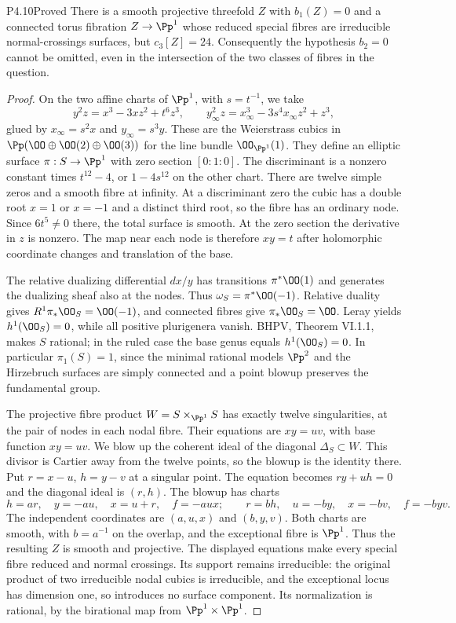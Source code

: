 \begin{statement}{P4.10}{Proved}
There is a smooth projective threefold $Z$ with $b_1(Z)=0$ and a
connected torus fibration $Z\to\Pp^1$ whose reduced special fibres
are irreducible normal-crossings surfaces, but $c_3[Z]=24$.
Consequently the hypothesis $b_2=0$ cannot be omitted, even in the
intersection of the two classes of fibres in the question.
\end{statement}
\begin{proof}
On the two affine charts of $\Pp^1$, with $s=t^{-1}$, we take
\[
 y^2z=x^3-3xz^2+t^6z^3,\qquad
 y_\infty^2z=x_\infty^3-3s^4x_\infty z^2+z^3,
\]
glued by $x_\infty=s^2x$ and $y_\infty=s^3y$. These are the
Weierstrass cubics in $\Pp(\OO\oplus\OO(2)\oplus\OO(3))$ for
the line bundle $\OO_{\Pp^1}(1)$. They define an elliptic surface
$\pi:S\to\Pp^1$ with zero section $[0:1:0]$. The discriminant
is a nonzero constant times $t^{12}-4$, or $1-4s^{12}$ on the
other chart. There are twelve simple zeros and a smooth fibre at
infinity. At a discriminant zero the cubic has a double root
$x=1$ or $x=-1$ and a distinct third root, so the fibre has an
ordinary node. Since $6t^5\ne0$ there, the total surface is smooth.
At the zero section the derivative in $z$ is nonzero. The map near
each node is therefore $xy=t$ after holomorphic coordinate changes
and translation of the base.

The relative dualizing differential $dx/y$ has transitions
$\pi^*\OO(1)$ and generates the dualizing sheaf also at the nodes.
Thus $\omega_S=\pi^*\OO(-1)$. Relative duality gives
$R^1\pi_*\OO_S=\OO(-1)$, and connected fibres give
$\pi_*\OO_S=\OO$. Leray yields $h^1(\OO_S)=0$, while all
positive plurigenera vanish. BHPV, Theorem VI.1.1, makes $S$
rational; in the ruled case the base genus equals $h^1(\OO_S)=0$.
In particular $\pi_1(S)=1$, since the minimal rational models
$\Pp^2$ and the Hirzebruch surfaces are simply connected and a
point blowup preserves the fundamental group.

The projective fibre product $W=S\times_{\Pp^1}S$ has exactly
twelve singularities, at the pair of nodes in each nodal fibre.
Their equations are $xy=uv$, with base function $xy=uv$. We blow
up the coherent ideal of the diagonal $\Delta_S\subset W$. This
divisor is Cartier away from the twelve points, so the blowup is
the identity there. Put $r=x-u$, $h=y-v$ at a singular point.
The equation becomes $ry+uh=0$ and the diagonal ideal is $(r,h)$.
The blowup has charts
\[
 h=ar,\quad y=-au,\quad x=u+r,\quad f=-aux;
 \qquad
 r=bh,\quad u=-by,\quad x=-bv,\quad f=-byv.
\]
The independent coordinates are $(a,u,x)$ and $(b,y,v)$.
Both charts are smooth, with $b=a^{-1}$ on the overlap, and the
exceptional fibre is $\Pp^1$. Thus the resulting $Z$ is smooth
and projective. The displayed equations make every special fibre
reduced and normal crossings. Its support remains irreducible:
the original product of two irreducible nodal cubics is irreducible,
and the exceptional locus has dimension one, so introduces no
surface component. Its normalization is rational, by the
birational map from $\Pp^1\times\Pp^1$.


\end{proof}
